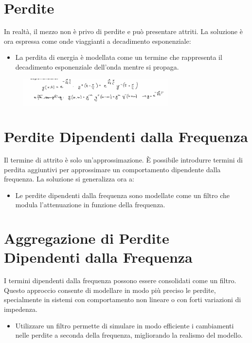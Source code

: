 \section{Perdite}

In realtà, il mezzo non è privo di perdite e può presentare attriti. La soluzione è ora espressa come onde viaggianti a decadimento esponenziale:

\begin{itemize}
  \item La perdita di energia è modellata come un termine che rappresenta il decadimento esponenziale dell'onda mentre si propaga.
\end{itemize}

\begin{figure}[H]
    \centering
    \includegraphics[width=0.7\textwidth]{capitoli/capitolo14/immagini/image4.jpeg}
\end{figure}

\section{Perdite Dipendenti dalla Frequenza}

Il termine di attrito è solo un'approssimazione. È possibile introdurre termini di perdita aggiuntivi per approssimare un comportamento dipendente dalla frequenza. La soluzione si generalizza ora a:

\begin{itemize}
  \item Le perdite dipendenti dalla frequenza sono modellate come un filtro che modula l'attenuazione in funzione della frequenza.
\end{itemize}

\section{Aggregazione di Perdite Dipendenti dalla Frequenza}

I termini dipendenti dalla frequenza possono essere consolidati come un filtro. Questo approccio consente di modellare in modo più preciso le perdite, specialmente in sistemi con comportamento non lineare o con forti variazioni di impedenza.

\begin{itemize}
  \item Utilizzare un filtro permette di simulare in modo efficiente i cambiamenti nelle perdite a seconda della frequenza, migliorando la realismo del modello.
\end{itemize}


